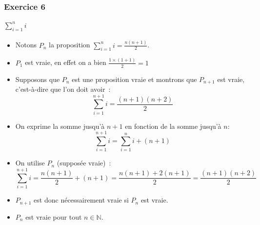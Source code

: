 \documentclass[10pt,notheorems]{beamer}
\theoremstyle{plain}
\theoremstyle{definition} %
\begin{document}
\begin{frame}
  \frametitle{Exercice 6}
  \framesubtitle{$\sum_{i=1}^n i$}
  \fontsize{8}{10}\selectfont

  \begin{itemize}

  \item Notons $P_n$ la proposition $\sum_{i=1}^n i = \frac{n(n+1)}{2}$.\newline

  \item $P_1$ est vraie, en effet on a bien $\frac{1 \times (1+1)}{2} = 1$\newline

  \item Supposons que $P_n$ est une proposition vraie et montrons que $P_{n+1}$ est vraie, c'est-à-dire  que l'on doit avoir~:
    \[
      \sum_{i=1}^{n+1} i = \frac{(n+1)(n+2)}{2}
    \]

  \item On exprime la somme jusqu'à $n+1$ en fonction de la somme jusqu'à $n$:
    \[
      \sum_{i=1}^{n+1} i = \sum_{i=1}^{n} i + (n+1)
    \]

  \item On utilise $P_n$ (supposée vraie)~:
    \[
        \sum_{i=1}^{n+1} i = \frac{n(n+1)}{2} + (n+1)
        = \frac{n(n+1)+2(n+1)}{2}
        = \frac{(n+1)(n+2)}{2}
    \]

  \item $P_{n+1}$ est donc nécessairement vraie si $P_{n}$ est vraie.\newline

  \item $P_n$ est vraie pour tout $n\in\mathbb N$.
    
  \end{itemize}
  
\end{frame}
\end{document}
